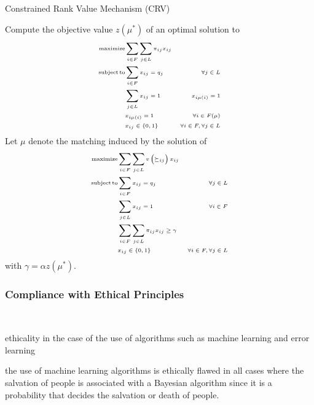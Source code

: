 \documentclass[letterpaper]{article} %
\begin{document}
    \begin{algorithm}
        \caption{Constrained Rank Value Mechanism (CRV)}\label{alg:crv}
        \KwResult{\(\mu\)}
        Compute the objective value \( z \left( \mu ^ { * } \right) \) of an optimal solution to
        \[\tiny
            \begin{aligned}
                \operatorname{maximize} & \sum_{i \in F} \sum_{j \in L} \pi_{i j} x_{i j} \\
                \operatorname {subject}\operatorname{to} & \sum_{i \in F} x_{i j}=q_{j} & \forall j \in L \\
                & \sum_{j \in L} x_{i j}=1 & x_{i \mu(i)}=1 \\
                & x_{i\mu (i)} = 1 &  \forall i \in F(\mu) \\
                & x_{i j} \in\{0,1\} & \forall i \in F, \forall j \in L
            \end{aligned}
        \]%
        Let \( \mu \) denote the matching induced by the solution of
        \[\tiny
            \begin{aligned}
                \operatorname{maximize} & \sum_{i \in F} \sum_{j \in L} v\left(\succeq_{i j}\right) x_{i j} \\
                \operatorname {subject}\operatorname{to} & \sum_{i \in F} x_{i j}=q_{j} & \forall j \in L \\
                & \sum_{j \in L} x_{i j}=1 & \forall i \in F \\
                & \sum_{i \in F} \sum_{j \in L} \pi_{i j} x_{i j} \geq \gamma \\
                & x_{i j} \in\{0,1\} & \forall i \in F, \forall j \in L
            \end{aligned}
        \]%
        with \( \gamma = \alpha z \left( \mu ^ { * } \right) \).
    \end{algorithm}

    \subsubsection{Compliance with Ethical Principles}\label{compliance-with-ethical-principles}~\citet{basshuysen}

    ethicality in the case of the use of algorithms such as machine learning and error learning

    the use of machine learning algorithms is ethically flawed in all cases where the salvation of people is associated
    with a Bayesian algorithm since it is a probability that decides the salvation or death of people.
\end{document}
